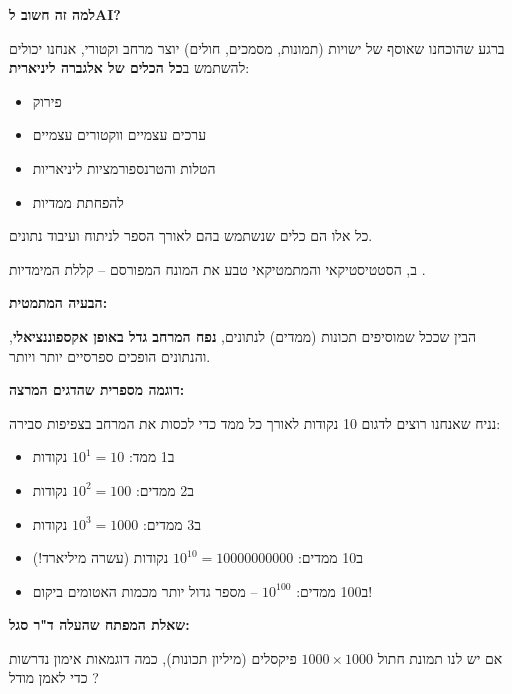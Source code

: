 \textbf{למה זה חשוב ל\en{-}AI?}

ברגע שהוכחנו שאוסף של ישויות (תמונות, מסמכים, חולים) יוצר מרחב וקטורי, אנחנו יכולים להשתמש ב\textbf{כל הכלים של אלגברה ליניארית}:

\begin{itemize}
\item פירוק 
\item ערכים עצמיים  ווקטורים עצמיים 
\item הטלות  והטרנספורמציות ליניאריות
\item {} להפחתת ממדיות
\end{itemize}

כל אלו הם כלים שנשתמש בהם לאורך הספר לניתוח ועיבוד נתונים.


ב\en{-}, הסטטיסטיקאי והמתמטיקאי  טבע את המונח המפורסם \textbf{} – קללת המימדיות \cite{bellman1957}.

\textbf{הבעיה המתמטית:}

 הבין שככל שמוסיפים תכונות (ממדים) לנתונים, \textbf{נפח המרחב גדל באופן אקספוננציאלי}, והנתונים הופכים ספרסיים  יותר ויותר.

\textbf{דוגמה מספרית שהדגים המרצה:}

נניח שאנחנו רוצים לדגום \num{10} נקודות לאורך כל ממד כדי לכסות את המרחב בצפיפות סבירה:

\begin{itemize}
\item ב\en{-}\num{1} ממד: $\num{10}^1 = \num{10}$ נקודות
\item ב\en{-}\num{2} ממדים: $\num{10}^2 = \num{100}$ נקודות
\item ב\en{-}\num{3} ממדים: $\num{10}^3 = \num{1000}$ נקודות
\item ב\en{-}\num{10} ממדים: $\num{10}^{10} = \num{10000000000}$ נקודות (עשרה מיליארד!)
\item ב\en{-}\num{100} ממדים: $\num{10}^{100}$ – מספר גדול יותר מכמות האטומים ביקום!
\end{itemize}

\textbf{שאלת המפתח שהעלה ד"ר סגל:}

אם יש לנו תמונת חתול $\num{1000} \times \num{1000}$ פיקסלים (מיליון תכונות), כמה דוגמאות אימון נדרשות כדי לאמן מודל ?

